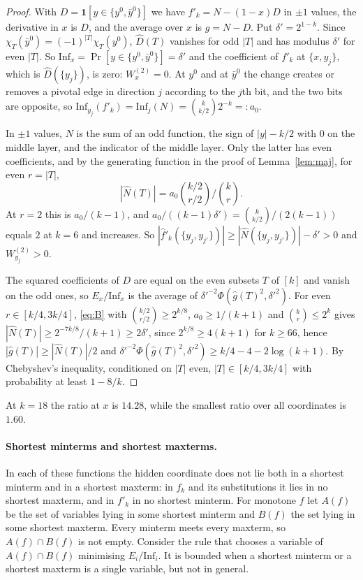 \documentclass[11pt]{amsart}
\theoremstyle{remark}
\newcommand{\Inf}{\mathrm{Inf}}
\begin{document}
\begin{proof}
With $D=\mathbf 1[y\in\{y^0,\bar y^0\}]$ we have $f'_k=N-(1-x)D$ in $\pm1$ values, the derivative in $x$ is $D$, and the
average over $x$ is $g=N-D$. Put $\delta'=2^{1-k}$. Since $\chi_T(\bar y^0)=(-1)^{|T|}\chi_T(y^0)$, $\hat D(T)$ vanishes for
odd $|T|$ and has modulus $\delta'$ for even $|T|$. So $\Inf_x=\Pr[y\in\{y^0,\bar y^0\}]=\delta'$ and the coefficient of
$f'_k$ at $\{x,y_j\}$, which is $\hat D(\{y_j\})$, is zero: $W^{(2)}_x=0$. At $y^0$ and at $\bar y^0$ the change creates or
removes a pivotal edge in direction $j$ according to the $j$th bit, and the two bits are opposite, so
$\Inf_{y_j}(f'_k)=\Inf_j(N)=\binom{k}{k/2}2^{-k}=:a_0$.

In $\pm1$ values, $N$ is the sum of an odd function, the sign of $|y|-k/2$ with $0$ on the middle layer, and the
indicator of the middle layer. Only the latter has even coefficients, and by the generating function in the proof of
Lemma~\ref{lem:maj}, for even $r=|T|$,
\begin{equation}\label{eq:B}
|\hat N(T)|=a_0\binom{k/2}{r/2}\Big/\binom kr.
\end{equation}
At $r=2$ this is $a_0/(k-1)$, and $a_0/((k-1)\delta')=\binom k{k/2}/(2(k-1))$ equals $2$ at $k=6$ and increases. So
$|\hat f'_k(\{y_j,y_{j'}\})|\ge|\hat N(\{y_j,y_{j'}\})|-\delta'>0$ and $W^{(2)}_{y_j}>0$.

The squared coefficients of $D$ are equal on the even subsets $T$ of $[k]$ and vanish on the odd ones, so $E_x/\Inf_x$ is the average of
$\delta'^{-2}\Phi(\hat g(T)^2,\delta'^2)$. For even $r\in[k/4,3k/4]$, \eqref{eq:B} with $\binom{k/2}{r/2}\ge2^{k/8}$,
$a_0\ge1/(k+1)$ and $\binom kr\le2^k$ gives $|\hat N(T)|\ge2^{-7k/8}/(k+1)\ge2\delta'$, since $2^{k/8}\ge4(k+1)$ for $k\ge66$, hence $|\hat
g(T)|\ge|\hat N(T)|/2$ and $\delta'^{-2}\Phi(\hat g(T)^2,\delta'^2)\ge k/4-4-2\log(k+1)$. By Chebyshev's inequality,
conditioned on $|T|$ even, $|T|\in[k/4,3k/4]$ with probability at least $1-8/k$.
\end{proof}

At $k=18$ the ratio at $x$ is $14.28$, while the smallest ratio over all coordinates is $1.60$.

\paragraph{Shortest minterms and shortest maxterms.}

In each of these functions the hidden coordinate does not lie both in a shortest minterm and in a shortest maxterm:
in $f_k$ and its substitutions it lies in no shortest maxterm, and in $f'_k$ in no shortest minterm. For monotone $f$
let $A(f)$ be the set of variables lying in some shortest minterm and $B(f)$ the set lying in some shortest maxterm.
Every minterm meets every maxterm, so $A(f)\cap B(f)$ is not empty. Consider the rule that chooses a variable of
$A(f)\cap B(f)$ minimising $E_i/\Inf_i$. It is bounded when a shortest minterm or a shortest maxterm is a single
variable, but not in general.
\end{document}
